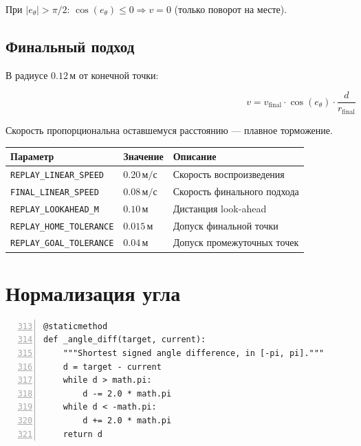 При $|e_\theta| > \pi/2$: $\cos(e_\theta) \leq 0 \Rightarrow v = 0$
(только поворот на месте).

\subsection{Финальный подход}

В радиусе $0.12\,\text{м}$ от конечной точки:

\begin{equation}
  v = v_{\text{final}} \cdot \cos(e_\theta) \cdot \frac{d}{r_{\text{final}}}
  \label{eq:final_approach}
\end{equation}

Скорость пропорциональна оставшемуся расстоянию --- плавное торможение.

\begin{center}
\begin{tabular}{lll}
\toprule
\textbf{Параметр} & \textbf{Значение} & \textbf{Описание}\\
\midrule
\texttt{REPLAY\_LINEAR\_SPEED}   & $0.20\,\text{м/с}$ & Скорость воспроизведения\\
\texttt{FINAL\_LINEAR\_SPEED}    & $0.08\,\text{м/с}$ & Скорость финального подхода\\
\texttt{REPLAY\_LOOKAHEAD\_M}    & $0.10\,\text{м}$   & Дистанция look-ahead\\
\texttt{REPLAY\_HOME\_TOLERANCE} & $0.015\,\text{м}$  & Допуск финальной точки\\
\texttt{REPLAY\_GOAL\_TOLERANCE} & $0.04\,\text{м}$   & Допуск промежуточных точек\\
\bottomrule
\end{tabular}
\end{center}

\section{Нормализация угла}

\begin{filebox}[title={\filepath{path\_recorder\_node.py}, строки 312--320 --- \_angle\_diff()}]
\begin{lstlisting}[style=pythonstyle, numbers=left, firstnumber=313]
@staticmethod
def _angle_diff(target, current):
    """Shortest signed angle difference, in [-pi, pi]."""
    d = target - current
    while d > math.pi:
        d -= 2.0 * math.pi
    while d < -math.pi:
        d += 2.0 * math.pi
    return d
\end{lstlisting}
\end{filebox}

